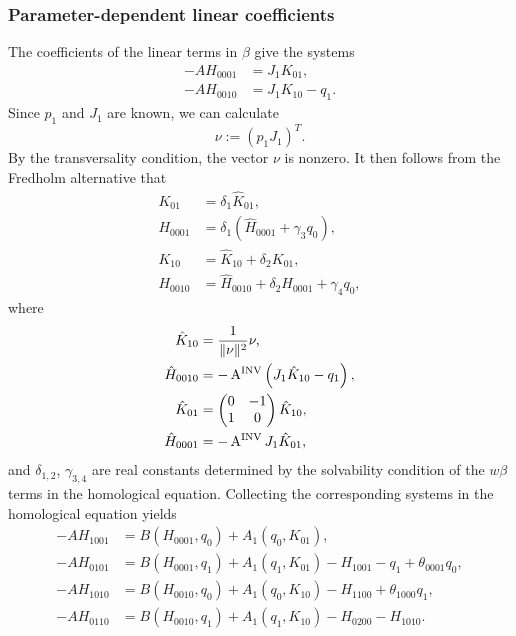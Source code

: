 \subsubsection{Parameter-dependent linear coefficients}
The coefficients of the linear terms in $\beta$ give the
systems
%
\begin{equation}
\label{eq:AH0010}
\begin{aligned}
-AH_{0001} &= J_1K_{01}, \\
-AH_{0010} &= J_1K_{10} - q_1.
\end{aligned}
\end{equation}
Since $p_1$ and $J_1$ are known, we can calculate 
\begin{equation*}
    \nu := (p_1 J_1)^T.
\end{equation*}
By the transversality condition, the vector $\nu$ is nonzero. It then follows
from the Fredholm alternative that
\begin{equation*}
\begin{aligned}
K_{01}   &= \delta_1\hat K_{01}, \\
H_{0001} &= \delta_1 \left( \hat H_{0001} + \gamma_3 q_0 \right), \\
K_{10}   &= \hat K_{10} + \delta_2 K_{01}, \\
H_{0010} &= \hat H_{0010} + \delta_2 H_{0001} + \gamma_4 q_0,
\end{aligned}
\end{equation*}
where
\begin{equation*}
\begin{aligned}
\hat K_{10} &= \frac1{\|\nu\|^2}\nu, \\
\hat H_{0010} &= -\operatorname{A^{\text{INV}}} \left(J_1\hat K_{10} - q_1 \right), \\
\hat K_{01} &=
\begin{pmatrix}
	0 & -1 \\ 1 & 0
\end{pmatrix} \hat K_{10}, \\
\hat H_{0001} &= -\operatorname{A^{\text{INV}}} J_1\hat K_{01},
\end{aligned}
\end{equation*}
and $\delta_{1,2}$, $\gamma_{3,4}$ are real constants determined by the
solvability condition of the $w\beta$ terms in the homological equation.
Collecting the corresponding systems in the homological equation yields 
\begin{equation*}
\begin{aligned}
-AH_{1001} &= B(H_{0001},q_0)+A_1(q_0,K_{01}), \\
-AH_{0101} &= B(H_{0001},q_1)+A_1(q_1,K_{01})-H_{1001}-q_1+\theta_{0001}q_0, \\
-AH_{1010} &= B(H_{0010},q_0)+A_1(q_0,K_{10})-H_{1100} +\theta_{1000}q_1,\\
-AH_{0110} &= B(H_{0010},q_1)+A_1(q_1,K_{10})-H_{0200}-H_{1010}.
\end{aligned}
\end{equation*}
